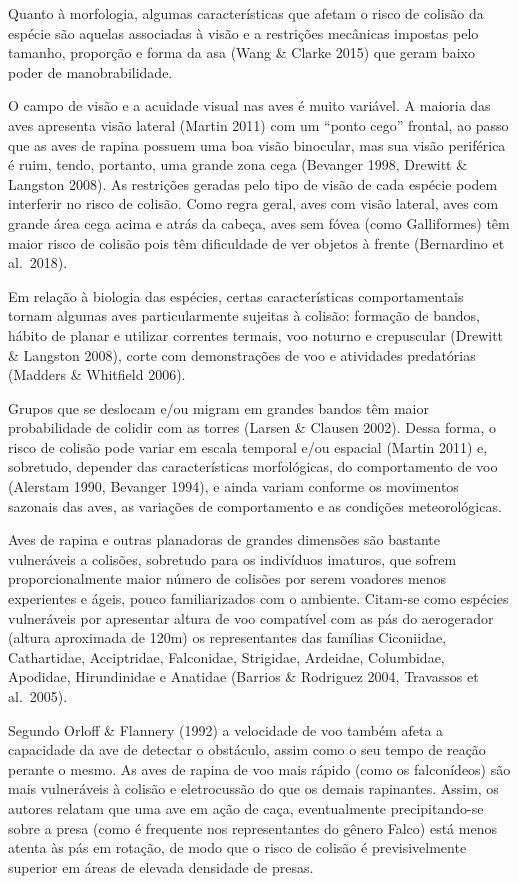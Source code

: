 \documentclass[
]{scrbook}
\begin{document}
Quanto à morfologia, algumas características que afetam o risco de colisão da espécie são aquelas associadas à visão e a restrições mecânicas impostas pelo tamanho, proporção e forma da asa (Wang \& Clarke 2015) que geram baixo poder de manobrabilidade.

O campo de visão e a acuidade visual nas aves é muito variável. A maioria das aves apresenta visão lateral (Martin 2011) com um ``ponto cego'' frontal, ao passo que as aves de rapina possuem uma boa visão binocular, mas sua visão periférica é ruim, tendo, portanto, uma grande zona cega (Bevanger 1998, Drewitt \& Langston 2008). As restrições geradas pelo tipo de visão de cada espécie podem interferir no risco de colisão. Como regra geral, aves com visão lateral, aves com grande área cega acima e atrás da cabeça, aves sem fóvea (como Galliformes) têm maior risco de colisão pois têm dificuldade de ver objetos à frente (Bernardino et al.~2018).

Em relação à biologia das espécies, certas características comportamentais tornam algumas aves particularmente sujeitas à colisão: formação de bandos, hábito de planar e utilizar correntes termais, voo noturno e crepuscular (Drewitt \& Langston 2008), corte com demonstrações de voo e atividades predatórias (Madders \& Whitfield 2006).

Grupos que se deslocam e/ou migram em grandes bandos têm maior probabilidade de colidir com as torres (Larsen \& Clausen 2002). Dessa forma, o risco de colisão pode variar em escala temporal e/ou espacial (Martin 2011) e, sobretudo, depender das características morfológicas, do comportamento de voo (Alerstam 1990, Bevanger 1994), e ainda variam conforme os movimentos sazonais das aves, as variações de comportamento e as condições meteorológicas.

Aves de rapina e outras planadoras de grandes dimensões são bastante vulneráveis a colisões, sobretudo para os indivíduos imaturos, que sofrem proporcionalmente maior número de colisões por serem voadores menos experientes e ágeis, pouco familiarizados com o ambiente. Citam-se como espécies vulneráveis por apresentar altura de voo compatível com as pás do aerogerador (altura aproximada de 120m) os representantes das famílias Ciconiidae, Cathartidae, Acciptridae, Falconidae, Strigidae, Ardeidae, Columbidae, Apodidae, Hirundinidae e Anatidae (Barrios \& Rodriguez 2004, Travassos et al.~2005).

Segundo Orloff \& Flannery (1992) a velocidade de voo também afeta a capacidade da ave de detectar o obstáculo, assim como o seu tempo de reação perante o mesmo. As aves de rapina de voo mais rápido (como os falconídeos) são mais vulneráveis à colisão e eletrocussão do que os demais rapinantes. Assim, os autores relatam que uma ave em ação de caça, eventualmente precipitando-se sobre a presa (como é frequente nos representantes do gênero Falco) está menos atenta às pás em rotação, de modo que o risco de colisão é previsivelmente superior em áreas de elevada densidade de presas.
\end{document}
